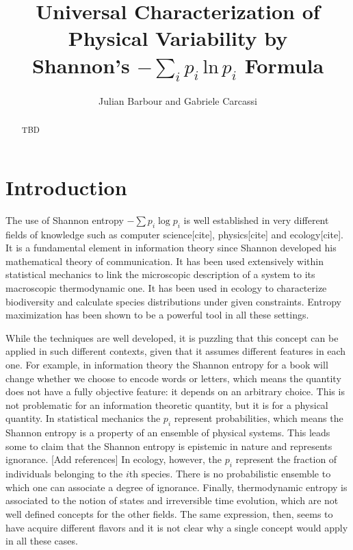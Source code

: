\documentclass{article}
\title{Universal Characterization of Physical Variability by \\Shannon's $-\sum_ip_i\,\textrm{ln}\,p_i$ Formula}
\author{
	Julian Barbour and 
	Gabriele Carcassi
}
\begin{document}
\maketitle

\tableofcontents

\begin{abstract}
TBD
\end{abstract}




\section{Introduction\label{int}}

The use of Shannon entropy $-\sum p_i \log p_i$ is well established in very different fields of knowledge such as computer science[cite], physics[cite] and ecology[cite]. It is a fundamental element in information theory since Shannon developed his mathematical theory of communication. It has been used extensively within statistical mechanics to link the microscopic description of a system to its macroscopic thermodynamic one. It has been used in ecology to characterize biodiversity and calculate species distributions under given constraints. Entropy maximization has been shown to be a powerful tool in all these settings.

While the techniques are well developed, it is puzzling that this concept can be applied in such different contexts, given that it assumes different features in each one. For example, in information theory the Shannon entropy for a book will change whether we choose to encode words or letters, which means the quantity does not have a fully objective feature: it depends on an arbitrary choice. This is not problematic for an information theoretic quantity, but it is for a physical quantity. In statistical mechanics the $p_i$ represent probabilities, which means the Shannon entropy is a property of an ensemble of physical systems. This leads some to claim that the Shannon entropy is epistemic in nature and represents ignorance. [Add references] In ecology, however, the $p_i$ represent the fraction of individuals belonging to the $i$th species. There is no probabilistic ensemble to which one can associate a degree of ignorance. Finally, thermodynamic entropy is associated to the notion of states and irreversible time evolution, which are not well defined concepts for the other fields. The same expression, then, seems to have acquire different flavors and it is not clear why a single concept would apply in all these cases.
\end{document}
